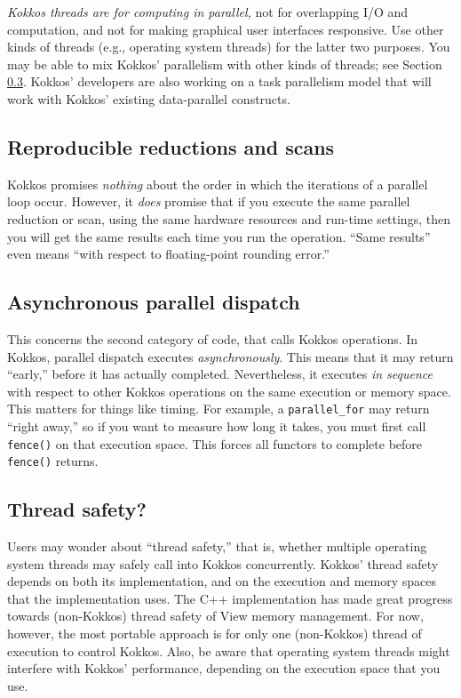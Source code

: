 \emph{Kokkos threads are for computing in parallel,}
not for overlapping I/O and computation,
and not for making graphical user interfaces responsive.
Use other kinds of threads (e.g., operating system threads) for the latter two purposes.
You may be able to mix Kokkos' parallelism with other kinds of threads;
see Section \ref{SS:Model:Exec:ThreadSafety}.
Kokkos' developers are also working on a task parallelism model
that will work with Kokkos' existing data-parallel constructs.

\subsection{Reproducible reductions and scans}\label{SS:Model:Exec:Repro}

Kokkos promises \emph{nothing} about the order in which the iterations of a parallel loop occur.
However, it \emph{does} promise that if you execute the same parallel reduction or scan,
using the same hardware resources and run-time settings,
then you will get the same results each time you run the operation.
``Same results'' even means ``with respect to floating-point rounding error.''

\subsection{Asynchronous parallel dispatch}\label{SS:Model:Exec:Async}

This concerns the second category of code, that calls Kokkos operations.
In Kokkos, parallel dispatch executes \emph{asynchronously}.  
This means that it may return ``early,'' before it has actually completed.
Nevertheless, it executes \emph{in sequence} with respect to other Kokkos operations on the same execution or memory space.
This matters for things like timing.
For example, a \lstinline!parallel_for! may return ``right away,''
so if you want to measure how long it takes,
you must first call \lstinline!fence()! on that execution space.
This forces all functors to complete before \lstinline!fence()! returns.

\subsection{Thread safety?}\label{SS:Model:Exec:ThreadSafety}

Users may wonder about ``thread safety,'' that is,
whether multiple operating system threads may safely call into Kokkos concurrently.
Kokkos' thread safety depends on both its implementation, 
and on the execution and memory spaces that the implementation uses.
The C++ implementation has made great progress towards (non-Kokkos) thread safety of View memory management.
For now, however, the most portable approach is for only one (non-Kokkos) thread of execution to control Kokkos.
Also, be aware that operating system threads might interfere with Kokkos' performance,
depending on the execution space that you use.

